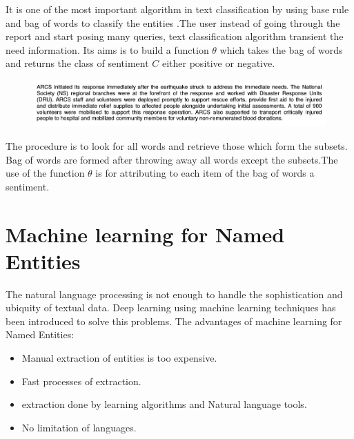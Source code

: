 It is one of the most important algorithm in text classification by using base rule and bag of words to classify the entities \citep{manning2012information}.The user instead of going through the report and start posing many queries, text classification algorithm transient the need information.
Its aims is to build a function $\theta$ which takes the bag of words and returns the class of sentiment $C$ either positive or negative.
\newpage
{\centering{$\theta$}

\centering{$\Updownarrow$}   

\begin{figure}[hbtp]
\centering
\includegraphics[scale=0.4]{images/report.png}\label{report}
\end{figure}

{\centering{$\Updownarrow$}}

{}

The procedure is to look for all words and retrieve those which form the subsets.  Bag of words are formed after throwing away  all words except the subsets.The use of the function $\theta$  is for  attributing  to each item of the bag of words a sentiment.}


\section{Machine learning for Named Entities\label{Chapter2}}
The natural language processing is not enough to handle the sophistication and ubiquity of textual data. Deep learning using machine learning techniques has been introduced to solve this problems. The advantages of machine learning for Named Entities:
\begin{itemize}
\item Manual extraction of entities is too expensive.
\item Fast processes of extraction.
\item extraction done by learning algorithms and Natural language tools.
\item No limitation of languages.
\end{itemize}

